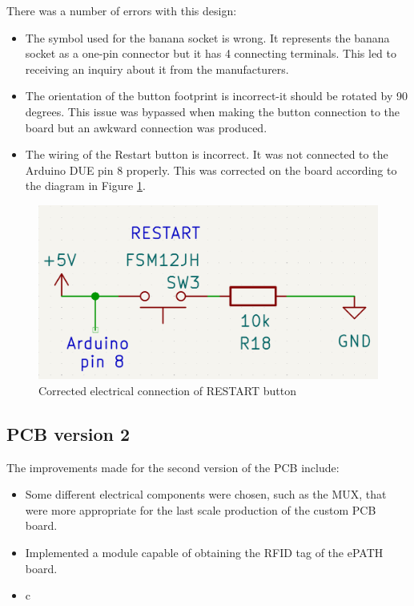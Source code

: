 There was a number of errors with this design:
\begin{itemize}
\item The symbol used for the banana socket is wrong. It represents the banana socket as a one-pin connector but it has 4 connecting terminals. This led to receiving an inquiry about it from the manufacturers.
\item The orientation of the button footprint is incorrect-it should be rotated by 90 degrees. This issue was bypassed when making the button connection to the board but an awkward connection was produced.
\item The wiring of the Restart button is incorrect. It was not connected to the Arduino DUE pin 8 properly. This was corrected on the board according to the diagram in Figure \ref{button_wiring}.
\end{itemize}

\begin{figure}[H]
          \centering
          \includegraphics[width=1\linewidth]{img/button_wiring.png}
          \caption{Corrected electrical connection of RESTART button}
          \label{button_wiring}
    \end{figure}



\subsection{PCB version 2}
The improvements made for the second version of the PCB include:
\begin{itemize}
\item Some different electrical components were chosen, such as the MUX, that were more appropriate for the last scale production of the custom PCB board.
\item Implemented a module capable of obtaining the RFID tag of the ePATH board.
\item c
\end{itemize}




